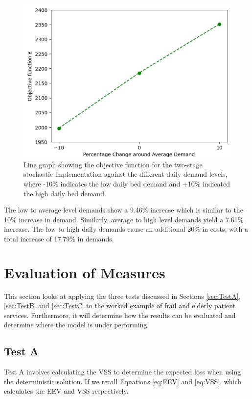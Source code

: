 \documentclass[../thesis.tex]{subfiles}
\begin{document}
\begin{figure}[h!]
    \centering
    \includegraphics[scale=0.75]{Chapters/Chapter4/Figures/WorkedExampleUp2.png}
    \caption{Line graph showing the objective function for the two-stage stochastic implementation against the different daily demand levels, where -10\% indicates the low daily bed demand and +10\% indicated the high daily bed demand.}
    \label{fig:WEStochastic1}
\end{figure}

The low to average level demands show a 9.46\% increase which is similar to the 10\% increase in demand. Similarly, average to high level demands yield a 7.61\% increase. The low to high daily demands cause an additional 20\% in costs, with a total increase of 17.79\% in demands.

\section{Evaluation of Measures}\label{sec:evalofmeasures}
This section looks at applying the three tests discussed in Sections \ref{sec:TestA}, \ref{sec:TestB} and \ref{sec:TestC} to the worked example of frail and elderly patient services. Furthermore, it will determine how the results can be evaluated and determine where the model is under performing.


\subsection{Test A}
Test A involves calculating the VSS to determine the expected loss when using the deterministic solution. If we recall Equations \eqref{eq:EEV} and \eqref{eq:VSS}, which calculates the EEV and VSS respectively.
\end{document}
